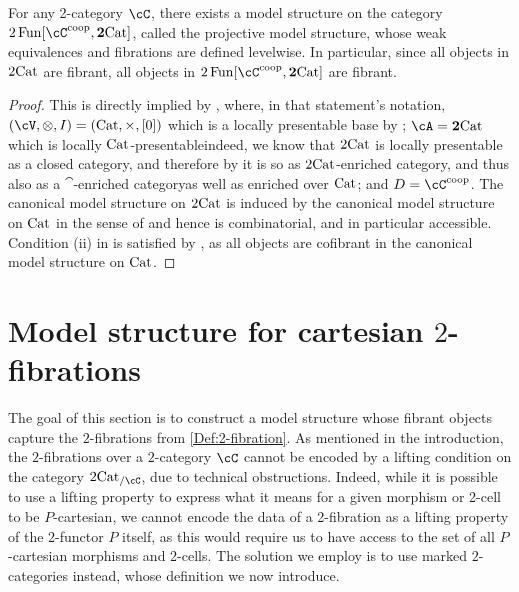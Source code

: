 \documentclass[11pt, dvipsnames]{amsart}
\begin{document}
    \begin{thm}
    For any 2-category $\cC$, there exists a model structure on the category \linebreak $2\Fun[\cC^{\coop}, \ttwocat]$, called the projective model structure, whose weak equivalences and fibrations are defined levelwise. In particular, since all objects in $2\mathrm{Cat}$ are fibrant, all objects in $2\Fun[\cC^{\coop}, \ttwocat]$ are fibrant. 
    \end{thm}
    \begin{proof}
        This is directly implied by \cite[Theorem 5.4]{Moser_2019}, where, in that statement's notation, $(\cV,\otimes,I)=(\Cat,\times, [0])$ which is a locally presentable base by \cite[Example 1.4]{MR1624638}; $\cA=\ttwocat$ which is locally $\mathrm{Cat}$-presentable\textemdash indeed, we know that $2\mathrm{Cat}$ is locally presentable as a closed category, and therefore by \cite[Proposition 4.8]{KellyLack_loc_presentable} it is so as $2\mathrm{Cat}$-enriched category, and thus also as a $\cat$-enriched category\textemdash as well as enriched over $\mathrm{Cat}$; and $D=\cC^\coop$. The canonical model structure on $2\mathrm{Cat}$ is induced by the canonical model structure on $\mathrm{Cat}$ in the sense of \cite{muro2014dwyer} and hence is combinatorial, and in particular accessible. Condition (ii) in \cite[Theorem 5.4]{Moser_2019} is satisfied by \cite[Remark 5.5]{Moser_2019}, as all objects are cofibrant in the canonical model structure on $\mathrm{Cat}$. 
    \end{proof}




    

\section{Model structure for cartesian \texorpdfstring{$2$}{2}-fibrations}
\label{sec:model-structure}
	The goal of this section is to construct a model structure whose fibrant objects capture the $2$-fibrations from \cref{Def:2-fibration}. As mentioned in the introduction, the $2$-fibrations over a $2$-category $\cC$ cannot be encoded by a lifting condition on the category $\twocat_{/ \cC}$, due to technical obstructions. Indeed, while it is possible to use a lifting property to express what it means for a given morphism or 2-cell to be $P$-cartesian, we cannot encode the data of a 2-fibration as a lifting property of the 2-functor $P$ itself, as this would require us to have access to the set of all $P$-cartesian
morphisms and 2-cells. The solution we employ is to use marked $2$-categories instead, whose definition we now introduce.
\end{document}
